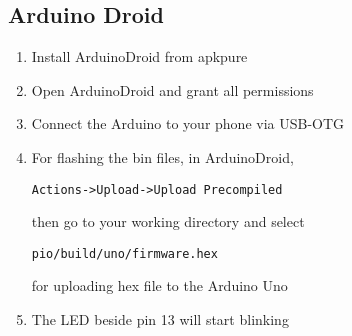 \subsection{Arduino Droid}
\begin{enumerate}[label=\arabic*.,ref=\theenumi]
\item Install ArduinoDroid from apkpure
\item Open ArduinoDroid and grant all permissions
\item Connect the Arduino to your phone via USB-OTG
\item For flashing the bin files, in ArduinoDroid,
\begin{lstlisting}
Actions->Upload->Upload Precompiled
\end{lstlisting}
then go to your working directory and select
\begin{lstlisting}
pio/build/uno/firmware.hex
\end{lstlisting}
for uploading hex file to the Arduino Uno
\item The LED beside pin 13 will start
blinking
\end{enumerate}




